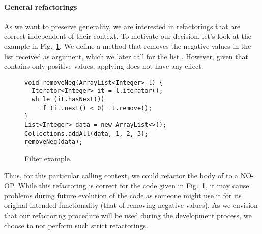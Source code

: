 \documentclass[runningheads,a4paper]{llncs}
\begin{document}
\paragraph{General refactorings}
As we want to preserve generality, 
we are interested in  refactorings that are
correct independent of their context.  To motivate our decision, let's
look at the example in Fig.~\ref{ex:filter1}.  We define a method
 that removes the negative values in the list received as
argument, which we later call for the list .  However, given that
 contains only positive values, applying  does not
have any effect.

\begin{figure}
  \begin{lstlisting}[mathescape=true,showstringspaces=false]
void removeNeg(ArrayList<Integer> l) {
  Iterator<Integer> it = l.iterator();
  while (it.hasNext())
    if (it.next() < 0) it.remove();
}
List<Integer> data = new ArrayList<>();
Collections.addAll(data, 1, 2, 3);
removeNeg(data);
\end{lstlisting}
\caption{Filter example.}
\label{ex:filter1}
\end{figure}

Thus, for this particular calling context, 
we could refactor the body of  to a NO-OP.
While this refactoring is correct for the code given in Fig.~\ref{ex:filter1}, 
it may cause problems during future evolution of the code 
as someone might use it for its original intended functionality 
(that of removing negative values). As we envision that our refactoring procedure 
will be used during the development process, we choose to not perform such 
strict refactorings.
\end{document}
